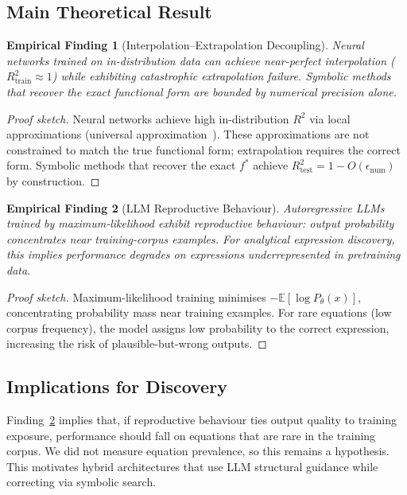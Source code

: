 \documentclass[twoside,11pt]{article}
\newcommand{\Rsq}{R^{2}}
\newcommand{\Rtrain}{R^{2}_{\mathrm{train}}}
\newcommand{\Rtest}{R^{2}_{\mathrm{test}}}
\newtheorem{finding}{Empirical Finding}
\begin{document}
\subsection{Main Theoretical Result}\label{subsec:main-theoretical-result}
\label{sec:theory_main}

\begin{finding}[Interpolation--Extrapolation Decoupling]
\label{prop:interp_extrap_decoupling}
Neural networks trained on in-distribution data can achieve near-perfect interpolation ($\Rtrain \approx 1$) while exhibiting catastrophic extrapolation failure. Symbolic methods that recover the exact functional form are bounded by numerical precision alone.
\end{finding}

\begin{proof}[Proof sketch]
Neural networks achieve high in-distribution $\Rsq$ via local approximations (universal approximation~\citep{hornik1989multilayer}). These approximations are not constrained to match the true functional form; extrapolation requires the correct form. Symbolic methods that recover the exact $f^*$ achieve $\Rtest = 1 - O(\epsilon_{\text{num}})$ by construction.
\end{proof}

\begin{finding}[LLM Reproductive Behaviour]
\label{thm:llm_reproductive}
Autoregressive LLMs trained by maximum-likelihood exhibit reproductive behaviour: output probability concentrates near training-corpus examples. For analytical expression discovery, this implies performance degrades on expressions underrepresented in pretraining data.
\end{finding}

\begin{proof}[Proof sketch]
Maximum-likelihood training minimises $-\mathbb{E}[\log P_\theta(x)]$, concentrating probability mass near training examples. For rare equations (low corpus frequency), the model assigns low probability to the correct expression, increasing the risk of plausible-but-wrong outputs.
\end{proof}

\subsection{Implications for Discovery}\label{subsec:implications-for-discovery}
\label{sec:theory_implications}

Finding~\ref{thm:llm_reproductive} implies that, if reproductive behaviour ties output quality to training exposure, performance should fall on equations that are rare in the training corpus. We did not measure equation prevalence, so this remains a hypothesis. This motivates hybrid architectures that use LLM structural guidance while correcting via symbolic search.
\end{document}
